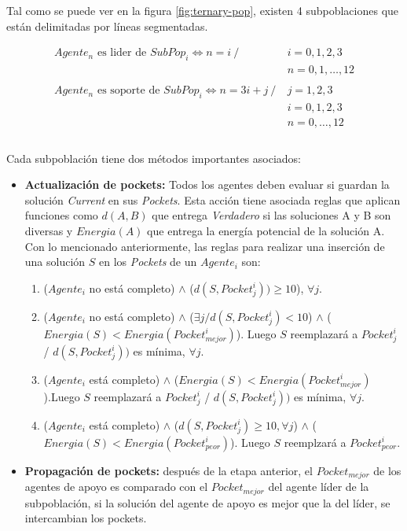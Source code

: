 Tal como se puede ver en la figura \ref{fig:ternary-pop}, existen 4 subpoblaciones que están delimitadas por líneas segmentadas.

\begin{equation*} 
    \begin{split}
        Agente_{n} \text{ es lider de } SubPop_i \Longleftrightarrow n = i ~/~ &i = 0,1,2,3\\
            &n=0,1,\dots,12 \\
        \\    
        Agente_{n} \text{ es soporte de } SubPop_i \Longleftrightarrow n = 3i+j ~/~ &j = 1,2,3\\
        &i=0,1,2,3\\
        &n=0,\dots,12\\
    \end{split} 
\end{equation*}
\\[15pt]


Cada subpoblación tiene dos métodos importantes asociados:
\begin{itemize}
	\item \textbf{Actualización de pockets:} Todos los agentes deben evaluar si guardan la solución \textit{Current} en sus \textit{Pockets}. Esta acción tiene asociada reglas que aplican funciones como $d(A,B)$ que entrega \textit{Verdadero} si las soluciones A y B son diversas y $Energia(A)$ que entrega la energía potencial de la solución A. Con lo mencionado anteriormente, las reglas para realizar una inserción de una solución $S$ en los \textit{Pockets} de un $Agente_i$ son:
        \begin{enumerate}
            \item ($Agente_i$ no está completo) $\wedge$ ($d(S,Pocket^i_j))\geq
            10$), $\forall j$.
             \item ($Agente_i$ no está completo) $\wedge$
            (${\exists}j/d(S,Pocket^{i}_j){<}10$) $\wedge$
            ($Energia(S){<}Energia(Pocket^{i}_{mejor})$). Luego $S$ reemplazará a
            $Pocket^{i}_j$ / $d(S,Pocket^{i}_j))$ es mínima, $\forall j$.
             \item ($Agente_i$ está completo) $\wedge$ ($Energia(S) <
            Energia(Pocket^{i}_{mejor})$).Luego $S$ reemplazará a $Pocket^{i}_j$ /
            $d(S,Pocket^{i}_j))$ es mínima, $\forall j$.
            \item ($Agente_i$ está completo) $\wedge$ ($d(S,Pocket^{i}_j) \geq 10,
            \forall j$) $\wedge$ ($Energia(S) < Energia(Pocket^{i}_{peor})$). Luego $S$
            reemplzará a $Pocket^{i}_{peor}$.
        \end{enumerate}
	\item \textbf{Propagación de pockets:} después de la etapa anterior, el $Pocket_{mejor}$ de los agentes de apoyo es comparado con el $Pocket_{mejor}$ del agente líder de la subpoblación, si la solución del agente de apoyo es mejor que la del líder, se intercambian los pockets.
\end{itemize}


